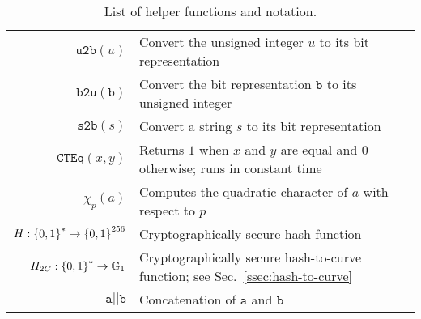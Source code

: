 \begin{table}
\centering
\begin{tabular}{r|p{}}
\hline
$\texttt{u2b}(u)$ & Convert the unsigned integer $u$ to its
    bit representation \\
$\texttt{b2u}(\texttt{b})$ & Convert the bit representation $\texttt{b}$
    to its unsigned integer \\
$\texttt{s2b}(s)$ & Convert a string $s$ to its bit representation \\
$\texttt{CTEq}(x,y)$ & Returns $1$ when $x$ and $y$ are equal and $0$
    otherwise; runs in constant time \\
$\chi_{p}(a)$ & Computes the quadratic character of $a$ with respect
    to $p$ \\
$H:\left\{ 0,1 \right\}^{*}\to\left\{ 0,1 \right\}^{256}$ & Cryptographically
    secure hash function \\
$H_{2C}:\left\{ 0,1 \right\}^{*}\to\mathbb{G}_{1}$ & Cryptographically secure
    hash-to-curve function; see Sec.~\ref{ssec:hash-to-curve} \\
$\texttt{a}||\texttt{b}$ & Concatenation of $\texttt{a}$
    and $\texttt{b}$ \\
\hline
\end{tabular}
\caption[List of helper functions and notation]{List of helper functions
    and notation.}
\label{tab:helper_funcs}
\end{table}
